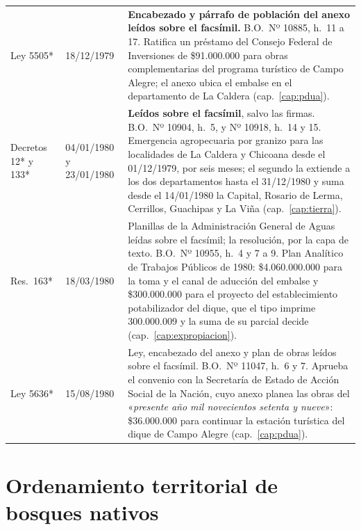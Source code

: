 \begin{longtable}{@{}p{3.2cm}p{1.9cm}p{7.9cm}@{}}
Ley 5505* & 18/12/1979 & \textbf{Encabezado y párrafo de población del anexo leídos sobre el facsímil.} B.O.\ Nº 10885, h.\ 11 a 17. Ratifica un préstamo del Consejo Federal de Inversiones de \$91.000.000 para obras complementarias del programa turístico de Campo Alegre; el anexo ubica el embalse en el departamento de La Caldera (cap.\ \ref{cap:pdua}). \\
Decretos 12* y 133* & 04/01/1980 y 23/01/1980 & \textbf{Leídos sobre el facsímil}, salvo las firmas. B.O.\ Nº 10904, h.\ 5, y Nº 10918, h.\ 14 y 15. Emergencia agropecuaria por granizo para las localidades de La Caldera y Chicoana desde el 01/12/1979, por seis meses; el segundo la extiende a los dos departamentos hasta el 31/12/1980 y suma desde el 14/01/1980 la Capital, Rosario de Lerma, Cerrillos, Guachipas y La Viña (cap.\ \ref{cap:tierra}). \\
Res.\ 163* & 18/03/1980 & Planillas de la Administración General de Aguas leídas sobre el facsímil; la resolución, por la capa de texto. B.O.\ Nº 10955, h.\ 4 y 7 a 9. Plan Analítico de Trabajos Públicos de 1980: \$4.060.000.000 para la toma y el canal de aducción del embalse y \$300.000.000 para el proyecto del establecimiento potabilizador del dique, que el tipo imprime 300.000.009 y la suma de su parcial decide (cap.\ \ref{cap:expropiacion}). \\
Ley 5636* & 15/08/1980 & Ley, encabezado del anexo y plan de obras leídos sobre el facsímil. B.O.\ Nº 11047, h.\ 6 y 7. Aprueba el convenio con la Secretaría de Estado de Acción Social de la Nación, cuyo anexo planea las obras del «\textit{presente año mil novecientos setenta y nueve}»: \$36.000.000 para continuar la estación turística del dique de Campo Alegre (cap.\ \ref{cap:pdua}). \\
\bottomrule
\end{longtable}

\section*{Ordenamiento territorial de bosques nativos}

